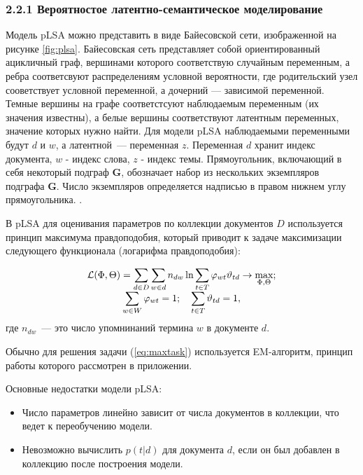 \documentclass[a4paper]{report}
\begin{document}
	
	\subsubsection{2.2.1 Вероятностое латентно-семантическое моделирование}
	Модель pLSA можно представить в виде Байесовской сети, изображенной на рисунке \ref{fig:plsa}. Байесовская сеть представляет собой ориентированный ацикличный граф, вершинами которого соответствую случайным переменным, а ребра соответсвуют распределениям условной вероятности, где родительский узел сооветствует условной переменной, а дочерний --- зависимой переменной. Темные вершины на графе соответстсуют наблюдаемым переменным (их значения известны), а белые вершины соответствуют латентным переменных, значение которых нужно найти. Для модели pLSA наблюдаемыми переменными будут $d$  и $w$, а латентной~--- переменная $z$. Переменная $d$ хранит индекс документа, $w$ - индекс слова, $z$ - индекс темы. Прямоугольник, включающий в себя некоторый подграф $\mathbf{G}$, обозначает набор из нескольких экземпляров подграфа $\mathbf{G}$. Число экземпляров определяется надписью в правом нижнем углу прямоугольника.
	\cite{bib:Heinrich}. 
	
	В pLSA для оценивания параметров по коллекции документов $D$ используется принцип максимума правдоподобия, который приводит к задаче максимизации следующего функционала (логарифма правдоподобия):
	
	\begin{equation}
		\begin{array}{c c}
		\mathcal{L}(\Phi,\Theta) = \mathlarger{ 
			\sum_{d \in D} 
			\sum_{w \in d}
			n_{dw} 
			\ln \sum_{t \in T}
			\varphi_{wt} \vartheta_{td} 
			\rightarrow \max_{\Phi, \Theta};
			} \\
		\mathlarger{
			\sum_{w \in W} \varphi_{wt} = 1; \quad \sum_{t \in T} \vartheta_{td} = 1,
		}
		\end{array}
	\label{eq:maxtask}
	\end{equation}
	где $n_{dw}$~--- это число упомнинаний термина $w$ в документе $d$.
	
	Обычно для решения задачи (\ref{eq:maxtask}) используется EM-алгоритм, принцип работы  которого рассмотрен в приложении.
	
	Основные недостатки модели pLSA:
	\begin{itemize}
	\item{Число параметров линейно зависит от числа документов в коллекции, что ведет к переобучению модели.}
	\item{Невозможно вычислить $p(t|d)$ для документа $d$, если он был добавлен в коллекцию после построения модели. \cite{bib:Voron1}  }
	\end{itemize}
	
\end{document}
